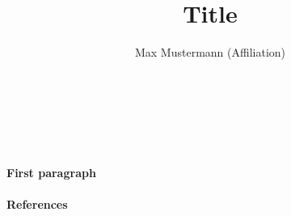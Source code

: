 \documentclass[
12pt,
a4paper,
]{article}
\author{Max Mustermann (Affiliation)}
\title{Title}
\makeatletter
\renewcommand\maketitle{

  ~\vspace{-1.1cm}

  {\raggedright
    \renewcommand{\baselinestretch}{1.2}\selectfont
  {\bfseries\large\@title}\\[2ex]
  {\large\@author}

  }
}
\makeatother
\begin{document}
\maketitle

\paragraph{First paragraph}

\paragraph{References}
{\tiny
\printbibliography[heading=none]
}
\end{document}
